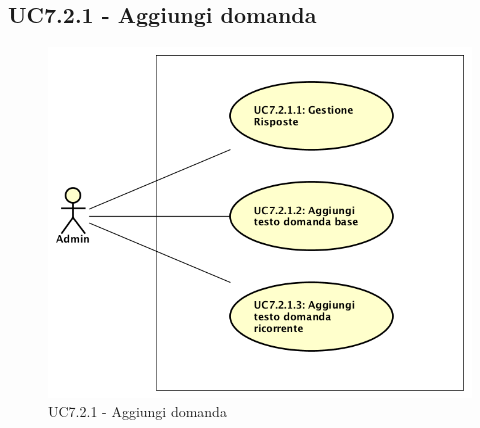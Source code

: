 \documentclass[../AnalisiDeiRequisiti_v4.0.0.tex]{subfiles}
\begin{document}
\subsection{UC7.2.1 - Aggiungi domanda} 
\label{sssec:UC7.2.1} 
\begin{figure}[!h]
	\centering
	\includegraphics[scale=0.7]{UseCases/UC7_GestionePannelloAdmin/UC7_2_GestioneDomande/UC7_2_1_AggiungiDomanda/UC7_2_1_AggiungiDomanda.png}
	\caption{UC7.2.1 - Aggiungi domanda}
\end{figure}
\end{document}
